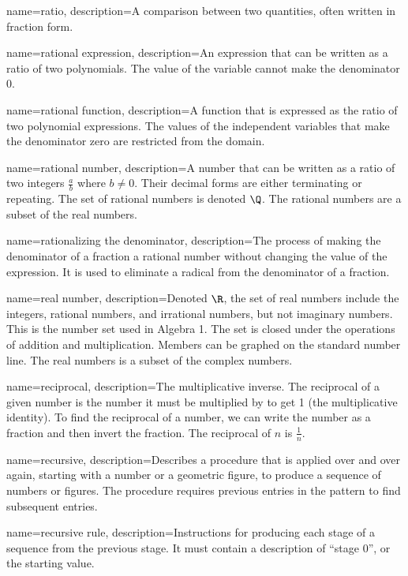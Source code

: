 {
	name=ratio,
	description={A comparison between two quantities, often written in fraction form.}
}

 {
	name=rational expression,
	description={An expression that can be written as a ratio of two polynomials. The value of the variable cannot make the denominator 0.}
}

 {
	name=rational function,
	description={A function that is expressed as the ratio of two polynomial expressions. The values of the independent variables that make the denominator zero are restricted from the domain.}
}

 {
	name=rational number,
	description={A number that can be written as a ratio of two integers $\frac{a}{b}$ where $b \neq 0$. Their decimal forms are either terminating or repeating. The set of rational numbers is denoted $\Q$. The rational numbers are a subset of the real numbers.}
}

 {
	name=rationalizing the denominator,
	description={The process of making the denominator of a fraction a rational number without changing the value of the expression. It is used to eliminate a radical from the denominator of a fraction.}
}

 {
	name=real number,
	description={Denoted $\R$, the set of real numbers include the integers, rational numbers, and irrational numbers, but not imaginary numbers. This is the number set used in Algebra 1. The set is closed under the operations of addition and multiplication. Members can be graphed on the standard number line.  The real numbers is a subset of the complex numbers.}
}

 {
	name=reciprocal,
	description={The multiplicative inverse. The reciprocal of a given number is the number it must be multiplied by to get 1 (the multiplicative identity). To find the reciprocal of a number, we can write the number as a fraction and then invert the fraction. The reciprocal of $n$ is $\frac{1}{n}$.}
}

 {
	name=recursive,
	description={Describes a procedure that is applied over and over again, starting with a number or a geometric figure, to produce a sequence of numbers or figures. The procedure requires previous entries in the pattern to find subsequent entries.}
}

 {
	name=recursive rule,
	description={Instructions for producing each stage of a sequence from the previous stage. It must contain a description of ``stage 0'', or the starting value.}
}

